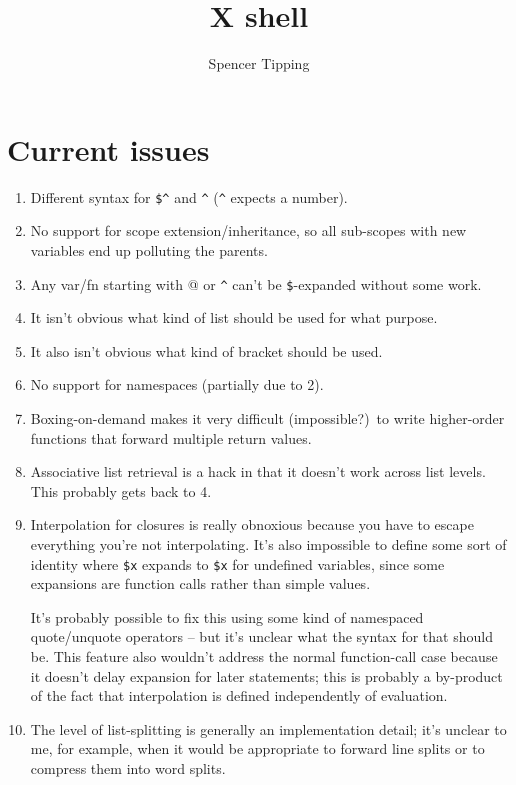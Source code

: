 \documentclass{report}
\title{X shell}
\author{Spencer Tipping}
\begin{document}
\maketitle{}
\tableofcontents{}


\chapter{Current issues}\label{chp:current-issues}
\begin{enumerate}
\item{}
  Different syntax for \verb|$^| and \verb|^| (\verb|^| expects a number).

\item{}
  No support for scope extension/inheritance, so all sub-scopes with new
  variables end up polluting the parents.

\item{}
  Any var/fn starting with @ or \verb|^| can't be \verb|$|-expanded without
  some work.

\item{}
  It isn't obvious what kind of list should be used for what purpose.

\item{}
  It also isn't obvious what kind of bracket should be used.

\item{}
  No support for namespaces (partially due to 2).

\item{}
  Boxing-on-demand makes it very difficult (impossible?)~to write
  higher-order functions that forward multiple return values.

\item{}
  Associative list retrieval is a hack in that it doesn't work across list
  levels. This probably gets back to 4.

\item{}
  Interpolation for closures is really obnoxious because you have to escape
  everything you're not interpolating. It's also impossible to define some
  sort of identity where \verb|$x| expands to \verb|$x| for undefined
  variables, since some expansions are function calls rather than simple
  values.

  It's probably possible to fix this using some kind of namespaced
  quote/unquote operators -- but it's unclear what the syntax for that
  should be. This feature also wouldn't address the normal function-call
  case because it doesn't delay expansion for later statements; this is
  probably a by-product of the fact that interpolation is defined
  independently of evaluation.

\item{}
  The level of list-splitting is generally an implementation detail; it's
  unclear to me, for example, when it would be appropriate to forward line
  splits or to compress them into word splits.
\end{enumerate}
\end{document}
